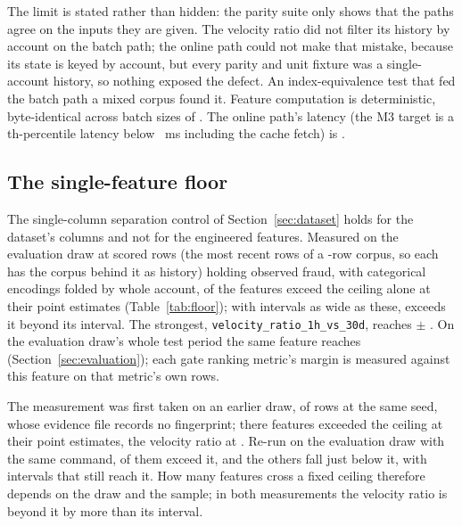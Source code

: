 The limit is stated rather than hidden: the parity suite only shows that the paths agree on the
inputs they are given. The velocity ratio did not filter its history by account on the batch path;
the online path could not make that mistake, because its state is keyed by account, but every
parity and unit fixture was a single-account history, so nothing exposed the defect. An
index-equivalence test that fed the batch path a mixed corpus found it. Feature computation is
deterministic, byte-identical across batch sizes of \nBatchSizes{}. The online path's latency
(the M3 target is a \nPctlFeature{}th-percentile latency below \nFeatureLatencyTarget{}~ms including the cache fetch) is
.

\subsection{The single-feature floor}
\label{sec:floor}

The single-column separation control of Section~\ref{sec:dataset} holds for the dataset's columns
and not for the engineered features. Measured on the evaluation draw at \nReScoredRows{} scored rows (the most recent rows of a
\nReCorpusRows{}-row corpus, so each has the corpus behind it as history)
holding \nReScoredFraud{} observed fraud, with categorical encodings folded by whole account,
\nReAboveCeiling{} of the \nFeatures{} features exceed the \nCeiling{} ceiling alone at their point
estimates (Table~\ref{tab:floor}); with intervals as wide as these, \nReAboveCeilingCI{} exceeds it
beyond its interval. The strongest, \texttt{velocity\_ratio\_1h\_vs\_30d}, reaches \nReVelocity{}
$\pm$ \nReVelocityci{}. On the evaluation draw's whole test period the same feature reaches
\nGateFloor{} (Section~\ref{sec:evaluation}); each gate ranking metric's margin is measured against
this feature on that metric's own rows.

The measurement was first taken on an earlier draw, of \nFloorDrawRows{} rows at the same seed,
whose evidence file records no fingerprint; there \nFeaturesAboveCeiling{} features exceeded the
ceiling at their point estimates, the velocity ratio at \nFloorM{}. Re-run on the evaluation draw with
the same command, \nReAboveCeiling{} of them exceed it, and the others fall just below it, with
intervals that still reach it. How many features cross a fixed ceiling therefore depends on the draw
and the sample; in both measurements the velocity ratio is beyond it by more than its interval.


